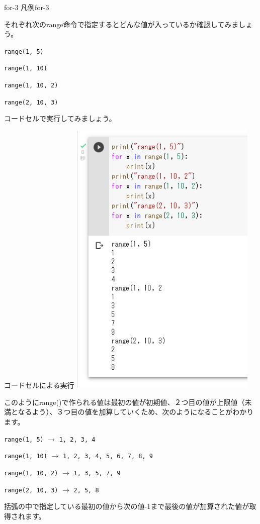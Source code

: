 \documentclass[11pt,a4paper,dvipdfmx,titlepage]{jsreport}
\begin{document}
\begin{pabox}{for-3}
凡例for-3

それぞれ次のrange命令で指定するとどんな値が入っているか確認してみましょう。
\begin{description}
\item {\tt range(1, 5)}
\item {\tt range(1, 10)}
\item {\tt range(1, 10, 2)}
\item {\tt range(2, 10, 3)}
\end{description}
 {\gt コードセルで実行}してみましょう。

\begin{legbox}{コードセルによる実行}
\includegraphics[width=9cm]{images/colab24.png}

\end{legbox}
\end{pabox}
このようにrange()で作られる値は最初の値が初期値、２つ目の値が上限値（未満となるよう）、３つ目の値を加算していくため、次のようになることがわかります。
\begin{description}
\item {\tt range(1, 5)} $\rightarrow$ {\tt 1, 2, 3, 4}
\item {\tt range(1, 10)}	$\rightarrow$	{\tt 1, 2, 3, 4, 5, 6, 7, 8, 9}
\item {\tt range(1, 10, 2)}	$\rightarrow$ {\tt 1, 3, 5, 7, 9}
\item {\tt range(2, 10, 3)}	$\rightarrow$ {\tt 2, 5, 8}
\end{description}
括弧の中で指定している最初の値から次の値-1まで最後の値が加算された値が取得されます。
\end{document}
